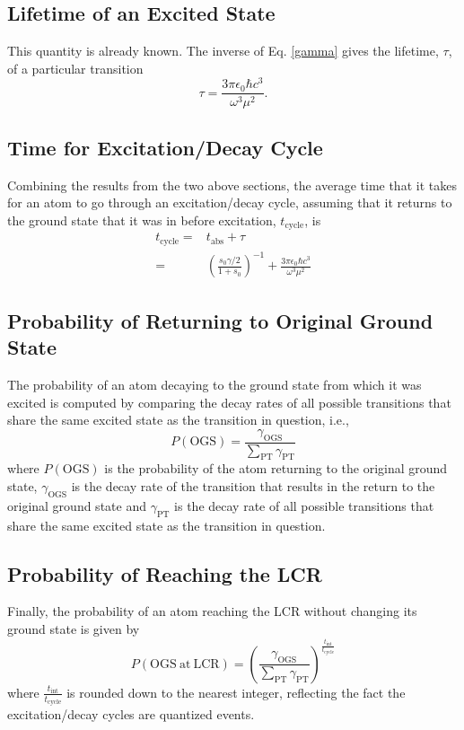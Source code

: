 \subsection{Lifetime of an Excited State}
This quantity is already known. The inverse of Eq. \ref{gamma} gives the lifetime, $\tau$, of a particular transition
\begin{equation}
\tau = \frac{3\pi\epsilon_0\hbar c^3}{\omega^3\mu^2}.
\end{equation}

\subsection{Time for Excitation/Decay Cycle}
Combining the results from the two above sections, the average time that it takes for an atom to go through an excitation/decay cycle, assuming that it returns to the ground state that it was in before excitation, $t_{\mathrm{cycle}}$, is
\begin{align}
t_{\mathrm{cycle}} =& t_{\mathrm{abs}}+ \tau\\
=& \left(\frac{s_0\gamma/2}{1+s_0}\right)^{-1} + \frac{3\pi\epsilon_0\hbar c^3}{\omega^3\mu^2}
\end{align}

\subsection{Probability of Returning to Original Ground State}
\label{pogs}
The probability of an atom decaying to the ground state from which it was excited is computed by comparing the decay rates of all possible transitions that share the same excited state as the transition in question, i.e., 
\begin{equation}
P(\mathrm{OGS}) = \frac{\gamma_{\mathrm{OGS}}}{\sum_{\mathrm{PT}}\gamma_{\mathrm{PT}}}
\end{equation}
where $P(\mathrm{OGS})$ is the probability of the atom returning to the original ground state, $\gamma_{\mathrm{OGS}}$ is the decay rate of the transition that results in the return to the original ground state and $\gamma_{\mathrm{PT}}$ is the decay rate of all possible transitions that share the same excited state as the transition in question.

\subsection{Probability of Reaching the LCR}
\label{pogslcr}
Finally, the probability of an atom reaching the LCR without changing its ground state is given by
\begin{equation}
P(\mathrm{OGS\ at\ LCR}) = \left(\frac{\gamma_{\mathrm{OGS}}}{\sum_{\mathrm{PT}}\gamma_{\mathrm{PT}}}\right)^{\frac{t_{\mathrm{int}}}{t_{\mathrm{cycle}}}}
\label{prob_unchanged}
\end{equation}
where $\frac{t_{\mathrm{int}}}{t_{\mathrm{cycle}}}$ is rounded down to the nearest integer, reflecting the fact the excitation/decay cycles are quantized events.

